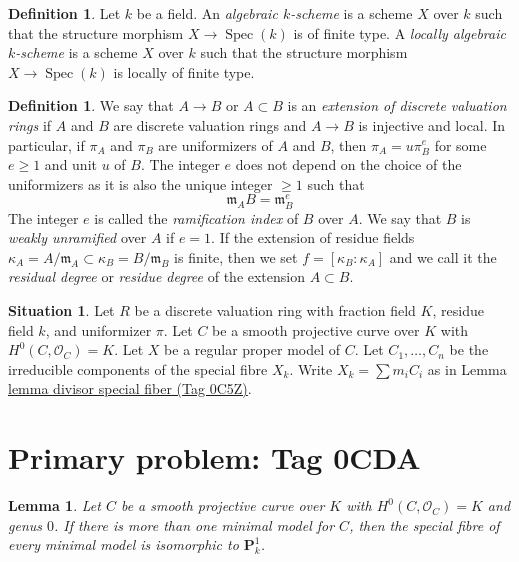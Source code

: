 \documentclass{amsart}
\theoremstyle{plain}
\newtheorem{lemma}[subsection]{Lemma}
\theoremstyle{definition}
\newtheorem{definition}[subsection]{Definition}
\newtheorem{situation}[subsection]{Situation}
\theoremstyle{remark}
\numberwithin{equation}{subsection}
\def\Spec{\mathop{\mathrm{Spec}}}
\begin{document}
\begin{definition}
\label{varieties-definition-algebraic-scheme}
Let $k$ be a field. An {\it algebraic $k$-scheme} is a scheme $X$ over $k$
such that the structure morphism $X \to \Spec(k)$ is of
finite type. A {\it locally algebraic $k$-scheme} is a scheme $X$ over $k$
such that the structure morphism $X \to \Spec(k)$ is
locally of finite type.
\end{definition}

\begin{definition}
\label{more-algebra-definition-extension-discrete-valuation-rings}
We say that $A \to B$ or $A \subset B$ is an
{\it extension of discrete valuation rings} if $A$ and $B$ are
discrete valuation rings and $A \to B$ is injective and local.
In particular, if $\pi_A$ and $\pi_B$ are uniformizers of
$A$ and $B$, then $\pi_A = u \pi_B^e$ for some $e \geq 1$ and unit
$u$ of $B$. The integer $e$ does not depend on the choice of
the uniformizers as it is also the unique integer $\geq 1$ such that
$$
\mathfrak m_A B = \mathfrak m_B^e
$$
The integer $e$ is called the {\it ramification index} of $B$ over $A$.
We say that $B$ is {\it weakly unramified} over $A$ if $e = 1$.
If the extension of residue fields
$\kappa_A = A/\mathfrak m_A \subset \kappa_B = B/\mathfrak m_B$
is finite, then we set $f = [\kappa_B : \kappa_A]$ and we
call it the {\it residual degree} or {\it residue degree}
of the extension $A \subset B$.
\end{definition}

\begin{situation}
\label{situation-regular-model}
Let $R$ be a discrete valuation ring with fraction field $K$,
residue field $k$, and uniformizer $\pi$.
Let $C$ be a smooth projective curve over $K$ with $H^0(C, \mathcal{O}_C) = K$.
Let $X$ be a regular proper model of $C$.
Let $C_1, \ldots, C_n$ be the irreducible components of the special
fibre $X_k$. Write $X_k = \sum m_i C_i$ as in
Lemma \href{https://stacks.math.columbia.edu/tag/0C5Z}{lemma divisor special fiber (Tag 0C5Z)}.
\end{situation}

\section*{Primary problem: Tag 0CDA}
\begin{lemma}
\label{lemma-nonuniqueness}
Let $C$ be a smooth projective curve over $K$ with $H^0(C, \mathcal{O}_C) = K$
and genus $0$. If there is more than one minimal model for $C$, then
the special fibre of every minimal model is isomorphic to $\mathbf{P}^1_k$.
\end{lemma}
\end{document}
